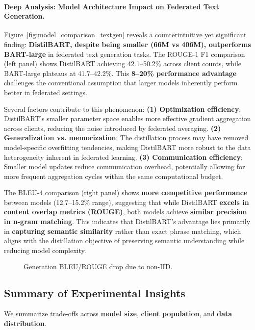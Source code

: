 \documentclass[conference]{IEEEtran}
\begin{document}
\paragraph{Deep Analysis: Model Architecture Impact on Federated Text Generation.} Figure~\ref{fig:model_comparison_textgen} reveals a counterintuitive yet significant finding: \textbf{DistilBART, despite being smaller (66M vs 406M), outperforms BART-large} in federated text generation tasks. The ROUGE-1 F1 comparison (left panel) shows DistilBART achieving 42.1--50.2\% across client counts, while BART-large plateaus at 41.7--42.2\%. This \textbf{8--20\% performance advantage} challenges the conventional assumption that larger models inherently perform better in federated settings.

Several factors contribute to this phenomenon: \textbf{(1) Optimization efficiency}: DistilBART's smaller parameter space enables more effective gradient aggregation across clients, reducing the noise introduced by federated averaging. \textbf{(2) Generalization vs. memorization}: The distillation process may have removed model-specific overfitting tendencies, making DistilBART more robust to the data heterogeneity inherent in federated learning. \textbf{(3) Communication efficiency}: Smaller model updates reduce communication overhead, potentially allowing for more frequent aggregation cycles within the same computational budget.

The BLEU-4 comparison (right panel) shows \textbf{more competitive performance} between models (12.7--15.2\% range), suggesting that while DistilBART \textbf{excels in content overlap metrics (ROUGE)}, both models achieve \textbf{similar precision in n-gram matching}. This indicates that DistilBART's advantage lies primarily in \textbf{capturing semantic similarity} rather than exact phrase matching, which aligns with the distillation objective of preserving semantic understanding while reducing model complexity.


\begin{figure}[H]
    \centering
    \caption{Generation BLEU/ROUGE drop due to non-IID.}
    \label{fig:gen_drop_noniid}
\end{figure}

\subsection{Summary of Experimental Insights}
We summarize trade-offs across \textbf{model size}, \textbf{client population}, and \textbf{data distribution}.
\end{document}
